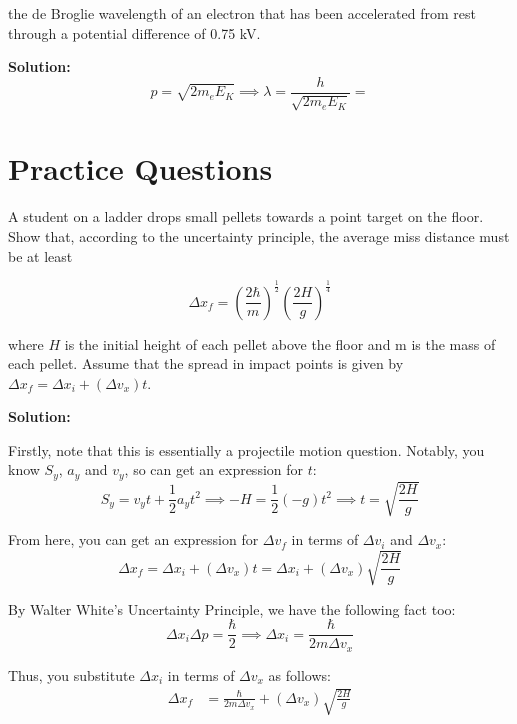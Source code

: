 \documentclass[a4paper, 12pt, addpoints]{exam}
\begin{document}
\begin{questions}
\begin{parts}
\begin{subparts}
        \subpart the de Broglie wavelength of an electron that has been accelerated from rest through a potential difference of 0.75 kV.
        \begin{tcolorbox}
            \textbf{Solution:}
            $$p = \sqrt{2m_eE_K} \implies \lambda = \frac{h}{\sqrt{2m_eE_K}} = $$
        \end{tcolorbox}
    \end{subparts}
\end{parts}
\end{questions}
\newpage

\section{Practice Questions}

\begin{questions}
\question A student on a ladder drops small pellets towards a point target on the floor. Show that, according to the uncertainty principle, the average miss distance must be at least

$$\Delta x_f = \left(\frac{2\hbar}{m} \right)^\frac{1}{2} \left(\frac{2H}{g} \right)^\frac{1}{4}$$

where $H$ is the initial height of each pellet above the floor and m is the mass of each pellet. Assume that the spread in impact points is given by $\Delta x_f = \Delta x_i + (\Delta v_x) t$.

\begin{tcolorbox}
\textbf{Solution:}

Firstly, note that this is essentially a projectile motion question. Notably, you know $S_y$, $a_y$ and $v_y$, so can get an expression for $t$:
$$S_y = v_yt + \frac{1}2 a_y t^2 \implies -H = \frac{1}2 (-g) t^2 \implies t = \sqrt{\frac{2H}{g}}$$

From here, you can get an expression for $\Delta v_f$ in terms of $\Delta v_i$ and $\Delta v_x$:
$$\Delta x_f = \Delta x_i + (\Delta v_x)t = \Delta x_i + (\Delta v_x) \sqrt{\frac{2H}{g}}$$

By Walter White's Uncertainty Principle, we have the following fact too:
$$\Delta x_i \Delta p = \frac{\hbar}{2} \implies \Delta x_i = \frac{\hbar}{2m\Delta v_x}$$

Thus, you substitute $\Delta x_i$ in terms of $\Delta v_x$ as follows:
\begin{align*}
    \Delta x_f &= \frac{\hbar}{2m\Delta v_x} + (\Delta v_x) \sqrt{\frac{2H}{g}}
\end{align*}


\end{tcolorbox}
\end{questions}
\end{document}
